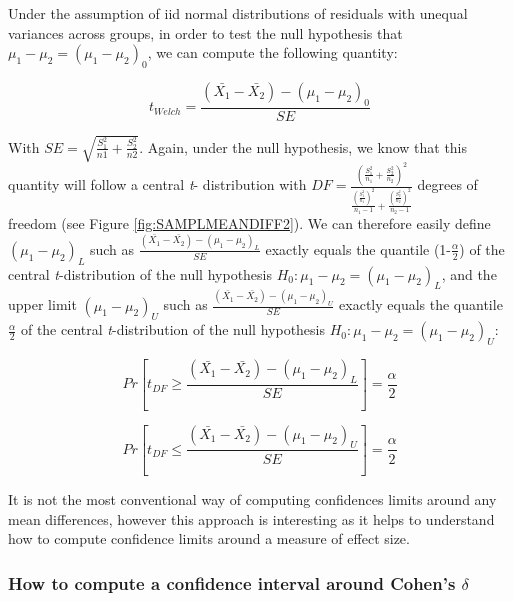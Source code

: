 \documentclass[
  man,floatsintext]{apa6}
\begin{document}
Under the assumption of iid normal distributions of residuals with unequal variances across groups, in order to test the null hypothesis that \(\mu_1-\mu_2= (\mu_1-\mu_2)_0\), we can compute the following quantity:

\begin{equation} 
t_{Welch}=\frac{(\bar{X_1}-\bar{X_2})-(\mu_1-\mu_2)_0}{SE}
\label{eq:twelch}
\end{equation}

With \(SE = \sqrt{\frac{S^2_1}{n1}+\frac{S^2_2}{n2}}\). Again, under the null hypothesis, we know that this quantity will follow a central \emph{t}- distribution with \(DF=\frac{(\frac{S^2_1}{n_1}+\frac{S^2_2}{n_2})^2}{\frac{(\frac{S^2_1}{n_1})^2}{n_1-1}+\frac{(\frac{S^2_2}{n_2})^2}{n_2-1}}\) degrees of freedom (see Figure \ref{fig:SAMPLMEANDIFF2}). We can therefore easily define \((\mu_1-\mu_2)_L\) such as \(\frac{(\bar{X_1}-\bar{X_2})-(\mu_1-\mu_2)_L}{SE}\) exactly equals the quantile (1-\(\frac{\alpha}{2}\)) of the central \emph{t}-distribution of the null hypothesis \(H_0: \mu_1 - \mu_2 = (\mu_1-\mu_2)_L\), and the upper limit \((\mu_1-\mu_2)_U\) such as \(\frac{(\bar{X_1}-\bar{X_2})-(\mu_1-\mu_2)_U}{SE}\) exactly equals the quantile \(\frac{\alpha}{2}\) of the central \emph{t}-distribution of the null hypothesis \(H_0: \mu_1 - \mu_2 = (\mu_1-\mu_2)_U\):

\begin{equation} 
Pr[t_{DF} \geq \frac{(\bar{X_1}-\bar{X_2})-(\mu_1-\mu_2)_L}{SE}]= \frac{\alpha}{2}
\label{eq:plausiblelimit1}
\end{equation}

\begin{equation} 
Pr[t_{DF} \leq \frac{(\bar{X_1}-\bar{X_2})-(\mu_1-\mu_2)_U}{SE}]= \frac{\alpha}{2}
\label{eq:plausiblelimit2}
\end{equation}

It is not the most conventional way of computing confidences limits around any mean differences, however this approach is interesting as it helps to understand how to compute confidence limits around a measure of effect size.

\hypertarget{how-to-compute-a-confidence-interval-around-cohens-delta}{%
\subsubsection{\texorpdfstring{How to compute a confidence interval around Cohen's \(\delta\)}{How to compute a confidence interval around Cohen's \textbackslash delta}}\label{how-to-compute-a-confidence-interval-around-cohens-delta}}
\end{document}
